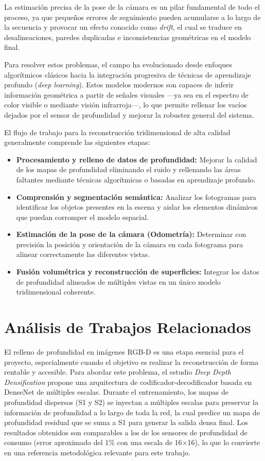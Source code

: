 \documentclass[12pt, a4, twoside, openany]{report}
\begin{document}
La estimación precisa de la pose de la cámara es un pilar fundamental de todo el proceso, ya que pequeños errores de seguimiento pueden acumularse a lo largo de la secuencia y provocar un efecto conocido como \textit{drift}, el cual se traduce en desalineaciones, paredes duplicadas e inconsistencias geométricas en el modelo final.

Para resolver estos problemas, el campo ha evolucionado desde enfoques algorítmicos clásicos hacia la integración progresiva de técnicas de aprendizaje profundo (\textit{deep learning}). Estos modelos modernos son capaces de inferir información geométrica a partir de señales visuales —ya sea en el espectro de color visible o mediante visión infrarroja—, lo que permite rellenar los vacíos dejados por el sensor de profundidad y mejorar la robustez general del sistema.

El flujo de trabajo para la reconstrucción tridimensional de alta calidad generalmente comprende las siguientes etapas:
\begin{itemize}
    \item \textbf{Procesamiento y relleno de datos de profundidad:} Mejorar la calidad de los mapas de profundidad eliminando el ruido y rellenando las áreas faltantes mediante técnicas algorítmicas o basadas en aprendizaje profundo.
    \item \textbf{Comprensión y segmentación semántica:} Analizar los fotogramas para identificar los objetos presentes en la escena y aislar los elementos dinámicos que puedan corromper el modelo espacial.
    \item \textbf{Estimación de la pose de la cámara (Odometría):} Determinar con precisión la posición y orientación de la cámara en cada fotograma para alinear correctamente las diferentes vistas.
    \item \textbf{Fusión volumétrica y reconstrucción de superficies:} Integrar los datos de profundidad alineados de múltiples vistas en un único modelo tridimensional coherente.
\end{itemize}

\section{Análisis de Trabajos Relacionados}

El relleno de profundidad en imágenes RGB-D es una etapa esencial para el proyecto, especialmente cuando el objetivo es realizar la reconstrucción de forma rentable y accesible. Para abordar este problema, el estudio \textit{Deep Depth Densification} \cite{chen2018estimating} propone una arquitectura de codificador-decodificador basada en DenseNet de múltiples escalas. Durante el entrenamiento, los mapas de profundidad dispersos (S1 y S2) se inyectan a múltiples escalas para preservar la información de profundidad a lo largo de toda la red, la cual predice un mapa de profundidad residual que se suma a S1 para generar la salida densa final. Los resultados obtenidos son comparables a los de los sensores de profundidad de consumo (error aproximado del 1\% con una escala de 16$\times$16), lo que lo convierte en una referencia metodológica relevante para este trabajo.
\end{document}
